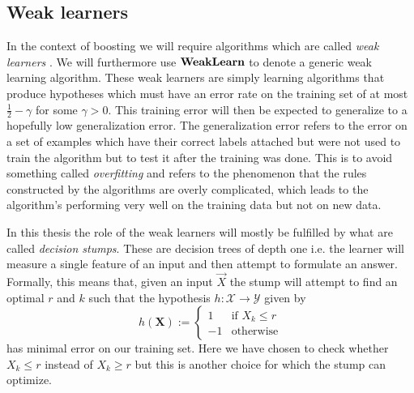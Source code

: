 \subsection{Weak learners}
\label{subsec:weak}
In the context of boosting we will require algorithms which are called \textit{weak learners} \cite{Freund1997}. We will furthermore use $\textbf{WeakLearn}$ to denote a generic weak learning algorithm. 
These weak learners are simply learning algorithms that produce hypotheses which must have an error rate on the training set of at most $\frac12 -\gamma $ for some $\gamma >0$. This training error will then be expected to generalize to a hopefully low generalization error.  
The generalization error refers to the error on a set of examples which have their correct labels attached but were not used to train the algorithm but to test it after the training was done. This is to avoid something called \textit{overfitting} and refers to the phenomenon that the rules constructed by the algorithms are overly complicated, which leads to the algorithm's performing very well on the training data but not on new data. 

\par In this thesis the role of the weak learners will mostly be fulfilled by what are called \textit{decision stumps}. These are decision trees of depth one i.e. the learner will measure a single feature of an input and then attempt to formulate an answer. Formally, this means that, given an input $\vec X$ the stump will attempt to find an optimal $r$ and $k$ such that the hypothesis $h:\mathcal X \to \mathcal Y$ given by $$h(\mathbf X):= \begin{cases}1 &\text{if } X_k \leq r\\-1&\text{otherwise}\end{cases}$$ has minimal error on our training set. Here we have chosen to check whether $X_k\leq r$ instead of $X_k\geq r$ but this is another choice for which the stump can optimize. 

